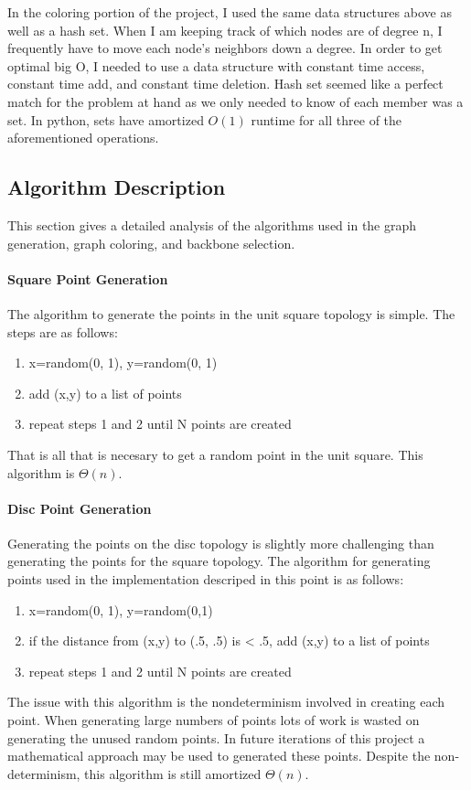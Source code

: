\documentclass{article}
\begin{document}
    In the coloring portion of the project, I used the same data structures above as well as a hash set.
    When I am keeping track of which nodes are of degree n, I frequently have to move each node's neighbors down a degree.
    In order to get optimal big O, I needed to use a data structure with constant time access, constant time add, and constant time deletion.
    Hash set seemed like a perfect match for the problem at hand as we only needed to know of each member was a set.
    In python, sets have amortized $O(1)$ runtime for all three of the aforementioned operations\cite{pythonwikiruntimes}.

	\subsection{Algorithm Description}
		This section gives a detailed analysis of the algorithms used in the graph generation, graph coloring, and backbone selection.

  \paragraph{Square Point Generation}
		The algorithm to generate the points in the unit square topology is simple.
		The steps are as follows:
    \begin{enumerate}
      \item x=random(0, 1), y=random(0, 1)
      \item add (x,y) to a list of points
      \item repeat steps 1 and 2 until N points are created
    \end{enumerate}
    That is all that is necesary to get a random point in the unit square.
    This algorithm is $\Theta(n)$.

  \paragraph{Disc Point Generation}
		Generating the points on the disc topology is slightly more challenging than generating the points for the square topology.
    The algorithm for generating points used in the implementation descriped in this point is as follows:
    \begin{enumerate}
      \item x=random(0, 1), y=random(0,1)
      \item if the distance from (x,y) to (.5, .5) is < .5, add (x,y) to a list of points
      \item repeat steps 1 and 2 until N points are created
    \end{enumerate}
    The issue with this algorithm is the nondeterminism involved in creating each point.
    When generating large numbers of points lots of work is wasted on generating the unused random points.
    In future iterations of this project a mathematical approach may be used to generated these points.
    Despite the non-determinism, this algorithm is still amortized $\Theta(n)$.
\end{document}
